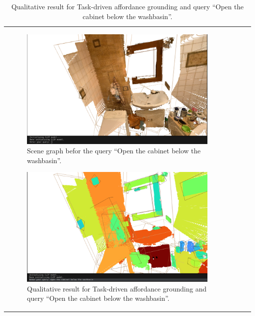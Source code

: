 \begin{longtable}{l|l|l|l}
\begin{figure}[ht!]
    \centering
    \includegraphics[width=\textwidth]{content/images/results/taskdrivenQ1.png}
    \caption{Scene graph befor the query \enquote{Open the cabinet below the washbasin}.}
    \label{fig:taskdrivenQ1}
\end{figure}

\begin{figure}[ht!]
    \centering
    \includegraphics[width=\textwidth]{content/images/results/taskdrivenA1.png}
    \caption{Qualitative result for Task-driven affordance grounding and query \enquote{Open the cabinet below the washbasin}.}
    \label{fig:taskdrivenA1}
\end{figure}


\end{longtable}
